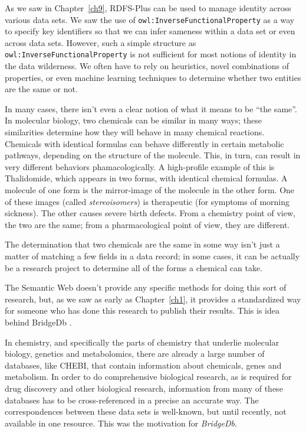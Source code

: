 As we saw in Chapter~\ref{ch9}, RDFS-Plus can be used to manage identity 
across various data sets.  We saw the use of \texttt{owl:InverseFunctionalProperty}
as a way to specify key identifiers so that we can infer sameness within a 
data set or even across data sets.  However, such a simple structure as 
\texttt{owl:InverseFunctionalProperty} is not sufficient for most notions of identity
in the data wilderness.  We often have to rely on heuristics, novel combinations
of properties, or even machine learning techniques to determine whether two 
entities are the same or not. 


In many cases, there isn't even a clear notion of what it means to be ``the same''.  
In molecular biology, two chemicals can be similar in many ways; these similarities 
determine how they will behave in many chemical reactions.  Chemicals with identical
formulas can behave differently in certain metabolic pathways, depending on the 
structure of the molecule.  This, in turn, can result in very different behaviors
phamacologically.  A high-profile example of this is Thalidomide, which appears in 
two forms, with identical chemical formulas.  A molecule of one form is the mirror-image
of the molecule in the other form.  One of these images (called \emph{stereoisomers}) 
is therapeutic (for symptoms of morning sickness).  The other causes severe birth
defects.  From a chemistry point of view, the two are the same; from a pharmacological 
point of view, they are different.  

The determination that two chemicals are the same in some way isn't just a matter of 
matching a few fields in a data record; in some cases, it can be actually be a research
project to determine all of the forms a chemical can take.  

The Semantic Web doesn't provide any specific methods for doing this sort of research, but,
as we saw as early as Chapter~\ref{ch1}, it provides a standardized way for someone 
who has done this research to publish their results.  This is idea behind BridgeDb \cite{van2010bridgedb}.

In chemistry, and specifically the parts of chemistry that underlie molecular biology, genetics
and metabolomics, there are already a large number of databases, like CHEBI, that contain information 
about chemicals, genes and metabolism.  
In order to do comprehensive biological research, as is required for drug discovery and 
other biological research, information from many of these databases has to be cross-referenced
in a precise an accurate way.  The correspondences between these data sets is well-known, 
but until recently, not available in one resource.  This was the motivation for \emph{BridgeDb}. 

